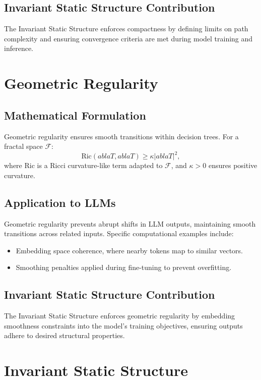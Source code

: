 \documentclass[12pt]{article}
\begin{document}
\subsection{Invariant Static Structure Contribution}
The Invariant Static Structure enforces compactness by defining limits on path complexity and ensuring convergence criteria are met during model training and inference.

\section{Geometric Regularity}

\subsection{Mathematical Formulation}
Geometric regularity ensures smooth transitions within decision trees. For a fractal space $\mathcal{F}$:
\begin{equation}
\text{Ric}(
abla T,
abla T) \geq \kappa |
abla T|^2,
\end{equation}
where $\text{Ric}$ is a Ricci curvature-like term adapted to $\mathcal{F}$, and $\kappa > 0$ ensures positive curvature.

\subsection{Application to LLMs}
Geometric regularity prevents abrupt shifts in LLM outputs, maintaining smooth transitions across related inputs. Specific computational examples include:
\begin{itemize}
    \item Embedding space coherence, where nearby tokens map to similar vectors.
    \item Smoothing penalties applied during fine-tuning to prevent overfitting.
\end{itemize}

\subsection{Invariant Static Structure Contribution}
The Invariant Static Structure enforces geometric regularity by embedding smoothness constraints into the model’s training objectives, ensuring outputs adhere to desired structural properties.

\section{Invariant Static Structure}
\end{document}
